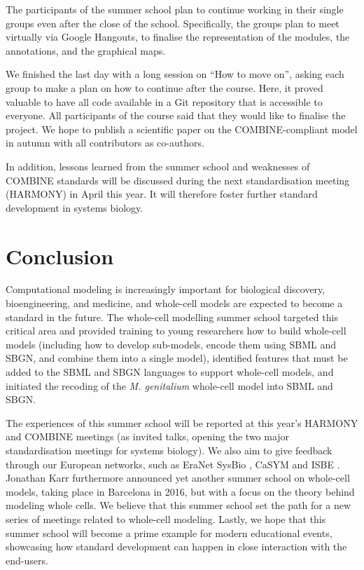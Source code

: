 \documentclass[journal,transmag]{IEEEtran}
\begin{document}
The participants of the summer school plan to continue working in their single groups even after the close of the school. 
Specifically, the groups plan to meet virtually via Google Hangouts, to finalise the representation of the modules, the annotations, and the graphical
maps. 

We finished the last day with a long session on ``How to move on'', asking each group to make a plan on how to continue after the course. 
Here, it proved valuable to have all code available in a Git repository that is accessible to everyone. 
All participants of the course said that they would like to finalise the project. 
We hope to publish a scientific paper on the COMBINE-compliant model in autumn with all contributors as co-authors.

In addition, lessons learned from the summer school and weaknesses of COMBINE standards will be discussed during the next standardisation meeting (HARMONY) in April this year. 
It will therefore foster further standard development in systems biology. 

\section{Conclusion}
Computational modeling is increasingly important for biological discovery, bioengineering, and medicine, and whole-cell models are expected to become a standard in the future. 
The whole-cell modelling summer school targeted this critical area and  provided  training to young researchers how to build whole-cell models (including how to develop sub-models, encode them using SBML and SBGN, and  combine them into a single model), identified features that must be added to the SBML and SBGN languages to support  whole-cell models, and initiated the recoding of the \textit{M. genitalium} whole-cell model into SBML and SBGN.

The experiences of this summer school will be reported at this year's HARMONY and COMBINE meetings (as invited talks, opening the two major standardisation meetings for
systems biology). 
We also aim to give feedback through our European networks, such as EraNet SysBio \cite{ERASysBio2015}, CaSYM \cite{CaSYM2015} and ISBE \cite{Wolkenhauer2009}.
Jonathan Karr furthermore announced yet another summer school on whole-cell models, taking place in Barcelona in 2016, but with a focus on the theory behind modeling whole cells.
We believe that this summer school set the path for a new series of meetings related to whole-cell modeling.
Lastly, we hope that this summer school will become a prime example for modern educational events, showcasing how standard development can happen in close interaction with the end-users.
\end{document}
